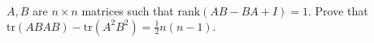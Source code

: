 $A, B$ are $n \times n$ matrices such that $\text{rank}(AB-BA+I) = 1.$ Prove that $\text{tr}(ABAB)-\text{tr}(A^2 B^2) = \frac{1}{2}n(n-1).$